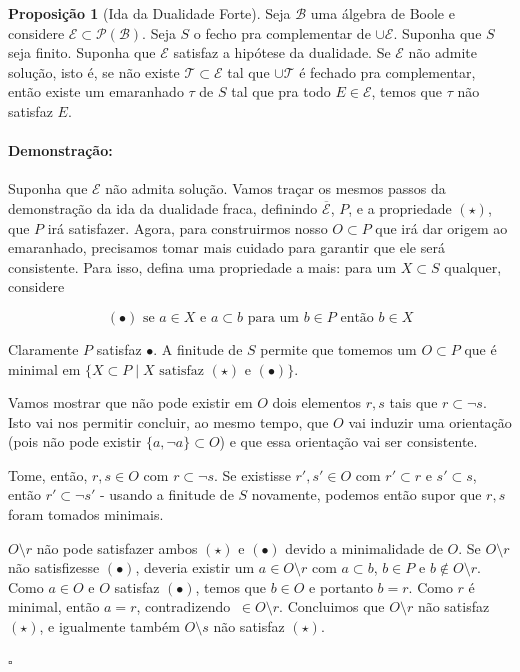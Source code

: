 \documentclass[11pt]{article}
\newcommand{\pulinho}{\vspace{.5cm}}
\theoremstyle{definition}
\theoremstyle{definition}
\theoremstyle{definition}
\newtheorem{prop}{Proposição}
\newenvironment{proposicao}{
\definecolor{shadecolor}{HTML}{FFDBDF}
\begin{shaded}
\begin{prop}
}
{
\end{prop}
\end{shaded}
}
\theoremstyle{definition}
\theoremstyle{definition}
\theoremstyle{definition}
\theoremstyle{definition}
\theoremstyle{definition}
\theoremstyle{definition}
\theoremstyle{definition}
\theoremstyle{definition}
\theoremstyle{definition}
\newenvironment{prova}{\paragraph{Demonstração:}}{\hfill$\square$ 
\pulinho
}
\theoremstyle{definition}
\theoremstyle{definition}
\begin{document}
\begin{proposicao}[Ida da Dualidade Forte]
  Seja $\mathcal{B}$ uma álgebra de Boole e considere $\mathcal{E} \subset \mathcal{P}(\mathcal{B})$. Seja $S$ o fecho pra complementar de $\cup \mathcal{E}$. Suponha que $S$ seja finito. Suponha que $\mathcal{E}$ satisfaz a hipótese da dualidade. Se $\mathcal{E}$ não admite solução, isto é, se não existe $\mathcal{T} \subset \mathcal{E}$ tal que $\cup \mathcal{T}$ é fechado pra complementar, então existe um emaranhado $\tau$ de $S$ tal que pra todo $E \in \mathcal{E}$, temos que $\tau$ não satisfaz $E$.
\end{proposicao}

\begin{prova}
  Suponha que $\mathcal{E}$ não admita solução. Vamos traçar os mesmos passos da demonstração da ida da dualidade fraca, definindo $\overline{\mathcal{E}}$, $P$, e a propriedade $(\star)$, que $P$ irá satisfazer. Agora, para construirmos nosso $O \subset P$ que irá dar origem ao emaranhado, precisamos tomar mais cuidado para garantir que ele será consistente. Para isso, defina uma propriedade a mais: para um $X \subset S$ qualquer, considere

  \[
  (\bullet) \text{ se } a \in X \text{ e } a \subset b \text{ para um } b \in P \text{ então } b \in X
  \]

  Claramente $P$ satisfaz $\bullet$. A finitude de $S$ permite que tomemos um $O \subset P$ que é minimal em $\{X \subset P \mid X \text{ satisfaz } (\star) \text{ e } (\bullet)\}$.

  Vamos mostrar que não pode existir em $O$ dois elementos $r,s$ tais que $r \subset \lnot s$. Isto vai nos permitir concluir, ao mesmo tempo, que $O$ vai induzir uma orientação (pois não pode existir $\{a,\lnot a\} \subset O$) e que essa orientação vai ser consistente.

  Tome, então, $r,s \in O$ com $r \subset \lnot s$. Se existisse $r',s' \in O$ com $r' \subset r$ e $s' \subset s$, então $r' \subset \lnot s'$ - usando a finitude de $S$ novamente, podemos então supor que $r,s$ foram tomados minimais. 

  $O \setminus r$ não pode satisfazer ambos $(\star)$ e $(\bullet)$ devido a minimalidade de $O$. Se $O \setminus r$ não satisfizesse $(\bullet)$, deveria existir um $a \in O\setminus r$ com $a \subset b$, $b \in P$ e $b \notin O\setminus r$. Como $a \in O$ e $O$ satisfaz $(\bullet)$, temos que $b \in O$ e portanto $b = r$. Como $r$ é minimal, então $a = r$, contradizendo $\ \in O \setminus r$. Concluimos que $O \setminus r$ não satisfaz $(\star)$, e igualmente também $O \setminus s$ não satisfaz $(\star)$.


\end{prova}
\end{document}
